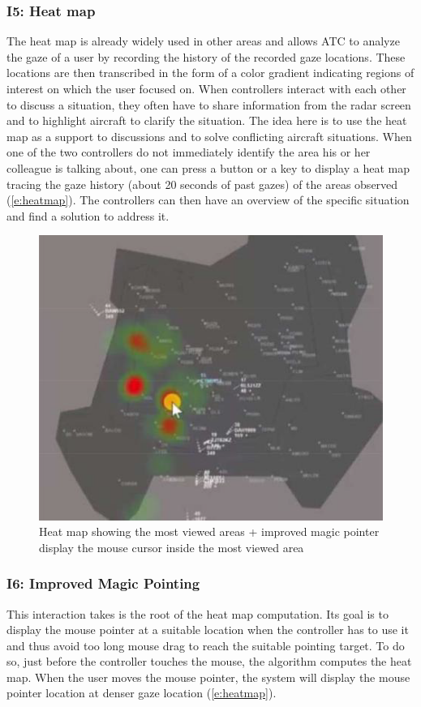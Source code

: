 \subsubsection{I5: Heat map}
The heat map is already widely used in other areas and
allows ATC to analyze the gaze of a user by recording the
history of the recorded gaze locations. These locations are
then transcribed in the form of a color gradient indicating
regions of interest on which the user focused on. When
controllers interact with each other to discuss a situation,
they often have to share information from the radar screen
and to highlight aircraft to clarify the situation. The idea
here is to use the heat map as a support to discussions and to
solve conflicting aircraft situations. When one of the
two controllers do not immediately identify the area his or
her colleague is talking about, one can press a button or a
key to display a heat map tracing the gaze history (about 20
seconds of past gazes) of the areas observed (\autoref{e:heatmap}). The
controllers can then have an overview of the specific
situation and find a solution to address it.

\begin{figure}
 \centering
	\includegraphics{Figures/heatmap.png}
	\caption{
	Heat map showing the most viewed areas +
improved magic pointer display the mouse cursor
inside the most viewed area}
	\label{e:heatmap}
\end{figure}

\subsubsection{I6: Improved Magic Pointing}
This interaction takes is the root of the heat map
computation. Its goal is to display the mouse pointer at a
suitable location when the controller has to use it and thus
avoid too long mouse drag to reach the suitable pointing
target. To do so, just before the controller touches the mouse,
the algorithm computes the heat map. When the user moves
the mouse pointer, the system will display the mouse pointer
location at denser gaze location (\autoref{e:heatmap}).

